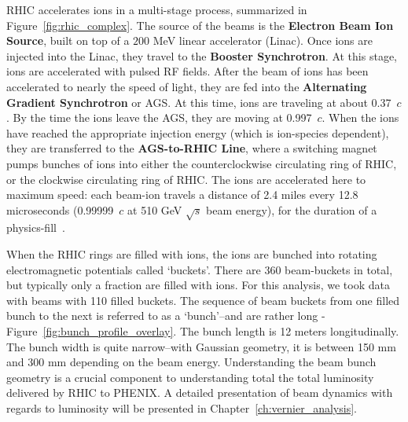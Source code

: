 RHIC accelerates ions in a multi-stage process, summarized in
Figure~\ref{fig:rhic_complex}. The source of the beams is the \textbf{Electron
Beam Ion Source}, built on top of a $200$ MeV linear accelerator (Linac). Once
ions are injected into the Linac, they travel to the \textbf{Booster
Synchrotron}.  At this stage, ions are accelerated with pulsed RF fields. After
the beam of ions has been accelerated to nearly the speed of light, they are fed
into the \textbf{Alternating Gradient Synchrotron} or AGS. At this time, ions
are traveling at about 0.37~$c$. By the time the ions leave the AGS, they are
moving at 0.997~$c$. When the ions have reached the appropriate injection energy
(which is ion-species dependent), they are transferred to the
\textbf{AGS-to-RHIC Line}, where a switching magnet pumps bunches of ions into
either the counterclockwise circulating ring of RHIC, or the clockwise
circulating ring of RHIC. The ions are accelerated here to maximum speed: each
beam-ion travels a distance of 2.4 miles every 12.8 microseconds (0.99999~$c$ at
510 GeV $\sqrt{s}$ beam energy), for the duration of a
physics-fill~\cite{RHIC2016}.

When the RHIC rings are filled with ions, the ions are bunched into rotating
electromagnetic potentials called `buckets'. There are 360 beam-buckets in
total, but typically only a fraction are filled with ions. For this analysis, we
took data with beams with 110 filled buckets. The sequence of beam buckets from
one filled bunch to the next is referred to as a `bunch'--and are rather long -
Figure~\ref{fig:bunch_profile_overlay}. The bunch length is 12 meters
longitudinally. The bunch width is quite narrow--with Gaussian geometry, it is
between 150 mm and 300 mm depending on the beam energy.  Understanding the beam
bunch geometry is a crucial component to understanding total the total
luminosity delivered by RHIC to PHENIX. A detailed presentation of beam
dynamics with regards to luminosity will be presented in
Chapter~\ref{ch:vernier_analysis}. 

